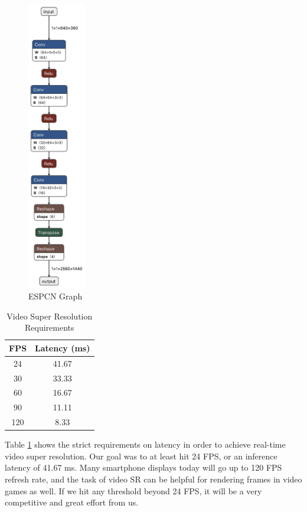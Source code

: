 \documentclass{article}
\begin{document}
\begin{figure}
	\centerline{\includegraphics[width=1in]{../final/figures/espcn_graph.png}}
	\caption{ESPCN Graph}
	\label{fig:espcn-graph}
\end{figure}

\begin{table}[ht]
	\caption{Video Super Resolution Requirements} %
	\centering %
	\begin{tabular}{c c} %
		\hline\hline %
		FPS & Latency (ms) \\ [0.5ex] %
		\hline %
		24  & 41.67        \\
		30  & 33.33        \\
		60  & 16.67        \\
		90  & 11.11        \\
		120 & 8.33         \\
		[1ex] %
		\hline %
	\end{tabular}
	\label{table:fps} %
\end{table}

Table \ref{table:fps} shows the strict requirements on latency in order to achieve real-time video super resolution. Our goal was to at least hit 24 FPS, or an inference latency of 41.67 ms. Many smartphone displays today will go up to 120 FPS refresh rate, and the task of video SR can be helpful for rendering frames in video games as well. If we hit any threshold beyond 24 FPS, it will be a very competitive and great effort from us.
\end{document}
